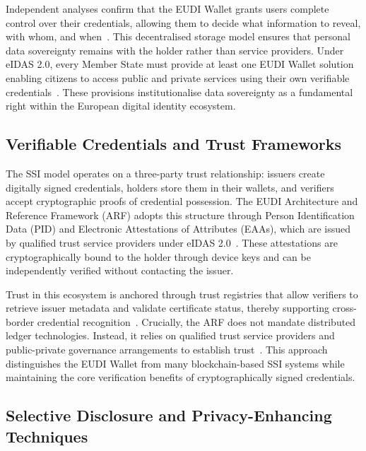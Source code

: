 \documentclass[sigconf,balance,nonacm,authordraft]{acmart}
\begin{document}
Independent analyses confirm that the EUDI Wallet grants users complete control over their credentials, allowing them to decide what information to reveal, with whom, and when~\cite{Gataca_ARF_SSI,ISC2_PrivacyDataSovereignty}. This decentralised storage model ensures that personal data sovereignty remains with the holder rather than service providers. Under eIDAS 2.0, every Member State must provide at least one EUDI Wallet solution enabling citizens to access public and private services using their own verifiable credentials~\cite{PortoThesis_Requirements}. These provisions institutionalise data sovereignty as a fundamental right within the European digital identity ecosystem.

\subsection{Verifiable Credentials and Trust Frameworks}

The SSI model operates on a three-party trust relationship: issuers create digitally signed credentials, holders store them in their wallets, and verifiers accept cryptographic proofs of credential possession. The EUDI Architecture and Reference Framework (ARF) adopts this structure through Person Identification Data (PID) and Electronic Attestations of Attributes (EAAs), which are issued by qualified trust service providers under eIDAS 2.0~\cite{PortoThesis_Structure}. These attestations are cryptographically bound to the holder through device keys and can be independently verified without contacting the issuer.

Trust in this ecosystem is anchored through trust registries that allow verifiers to retrieve issuer metadata and validate certificate status, thereby supporting cross-border credential recognition~\cite{PortoThesis_Structure,Finextra_SSI_Components}. Crucially, the ARF does not mandate distributed ledger technologies. Instead, it relies on qualified trust service providers and public-private governance arrangements to establish trust~\cite{Finextra_SSI_Differences}. This approach distinguishes the EUDI Wallet from many blockchain-based SSI systems while maintaining the core verification benefits of cryptographically signed credentials.

\subsection{Selective Disclosure and Privacy-Enhancing Techniques}
\end{document}
